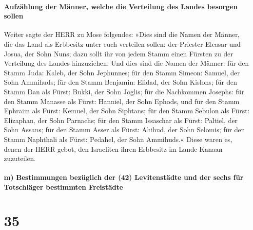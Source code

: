 \hypertarget{aufzuxe4hlung-der-muxe4nner-welche-die-verteilung-des-landes-besorgen-sollen}{%
\paragraph{Aufzählung der Männer, welche die Verteilung des Landes
besorgen
sollen}\label{aufzuxe4hlung-der-muxe4nner-welche-die-verteilung-des-landes-besorgen-sollen}}

Weiter sagte der HERR zu Mose folgendes:
»Dies sind die Namen der Männer, die das Land als
Erbbesitz unter euch verteilen sollen: der Priester Eleasar und Josua,
der Sohn Nuns; dazu sollt ihr von jedem Stamm einen
Fürsten zu der Verteilung des Landes hinzuziehen. Und
dies sind die Namen der Männer: für den Stamm Juda: Kaleb, der Sohn
Jephunnes; für den Stamm Simeon: Samuel, der Sohn
Ammihuds; für den Stamm Benjamin: Elidad, der Sohn
Kislons; für den Stamm Dan als Fürst: Bukki, der Sohn
Joglis; für die Nachkommen Josephs: für den Stamm Manasse
als Fürst: Hanniel, der Sohn Ephods, und für den Stamm
Ephraim als Fürst: Kemuel, der Sohn Siphtans; für den
Stamm Sebulon als Fürst: Elizaphan, der Sohn Parnachs;
für den Stamm Issaschar als Fürst: Paltiel, der Sohn
Assans; für den Stamm Asser als Fürst: Ahihud, der Sohn
Selomis; für den Stamm Naphthali als Fürst: Pedahel, der
Sohn Ammihuds.« Diese waren es, denen der HERR gebot, den
Israeliten ihren Erbbesitz im Lande Kanaan zuzuteilen.

\hypertarget{m-bestimmungen-bezuxfcglich-der-42-levitenstuxe4dte-und-der-sechs-fuxfcr-totschluxe4ger-bestimmten-freistuxe4dte}{%
\paragraph{m) Bestimmungen bezüglich der (42) Levitenstädte und der
sechs für Totschläger bestimmten
Freistädte}\label{m-bestimmungen-bezuxfcglich-der-42-levitenstuxe4dte-und-der-sechs-fuxfcr-totschluxe4ger-bestimmten-freistuxe4dte}}

\hypertarget{section-34}{%
\section{35}\label{section-34}}

